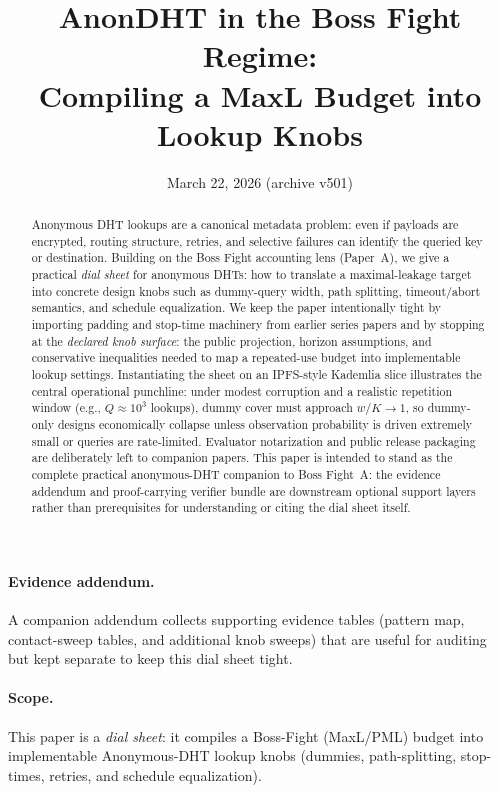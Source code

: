 \documentclass[11pt]{article}
\title{AnonDHT in the Boss Fight Regime:\\ Compiling a MaxL Budget into Lookup Knobs}
\author{}
\date{March 22, 2026 (archive v501)}
\begin{document}
\maketitle

\begin{abstract}
Anonymous DHT lookups are a canonical metadata problem: even if payloads are encrypted, routing structure, retries, and selective failures can identify the queried key or destination.
Building on the Boss Fight accounting lens (Paper~A), we give a practical \emph{dial sheet} for anonymous DHTs:
how to translate a maximal-leakage target into concrete design knobs such as dummy-query width, path splitting, timeout/abort semantics, and schedule equalization.
We keep the paper intentionally tight by importing padding and stop-time machinery from earlier series papers and by stopping at the \emph{declared knob surface}: the public projection, horizon assumptions, and conservative inequalities needed to map a repeated-use budget into implementable lookup settings.
Instantiating the sheet on an IPFS-style Kademlia slice illustrates the central operational punchline: under modest corruption and a realistic repetition window (e.g., $Q\approx10^3$ lookups), dummy cover must approach $w/K\to 1$, so dummy-only designs economically collapse unless observation probability is driven extremely small or queries are rate-limited.
Evaluator notarization and public release packaging are deliberately left to companion papers.
This paper is intended to stand as the complete practical anonymous-DHT companion to Boss Fight~A: the evidence addendum and proof-carrying verifier bundle are downstream optional support layers rather than prerequisites for understanding or citing the dial sheet itself.
\end{abstract}

\paragraph{Evidence addendum.} A companion addendum collects supporting evidence tables (pattern map, contact-sweep tables, and additional knob sweeps) that are useful for auditing but kept separate to keep this dial sheet tight.\cite{series:bossfightBaddendum}


\paragraph{Scope.}
This paper is a \emph{dial sheet}: it compiles a Boss-Fight (MaxL/PML) budget into implementable Anonymous-DHT lookup knobs (dummies, path-splitting, stop-times, retries, and schedule equalization).
\end{document}
